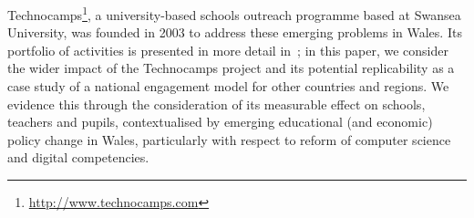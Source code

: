 \documentclass{llncs}
\begin{document}


Technocamps\footnote{\url{http://www.technocamps.com}}, a
university-based schools outreach programme based at Swansea
University, was founded in 2003 to address these emerging problems in
Wales. Its portfolio of activities is presented in more detail
in~\cite{crick+moller-wipsce2015}; in this paper, we consider the
wider impact of the Technocamps project and its potential
replicability as a case study of a national engagement model for other
countries and regions. We evidence this through the consideration of
its measurable effect on schools, teachers and pupils, contextualised
by emerging educational (and economic) policy change in Wales,
particularly with respect to reform of computer science and digital
competencies.
\end{document}

